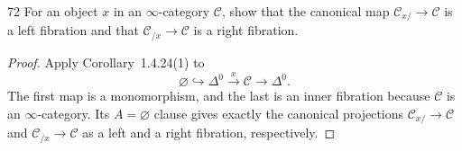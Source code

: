 \begin{exercise}{72}
For an object $x$ in an $\infty$-category $\mathcal C$, show that the canonical map $\mathcal C_{x/}\to\mathcal C$ is a
left fibration and that $\mathcal C_{/x}\to\mathcal C$ is a right fibration.

\begin{proof}
Apply Corollary~1.4.24(1) to
\[
 \varnothing\hookrightarrow\Delta^0
 \xrightarrow{x}\mathcal C\longrightarrow\Delta^0.
\]
The first map is a monomorphism, and the last is an
inner fibration because $\mathcal C$ is an
$\infty$-category.
Its $A=\varnothing$ clause gives exactly the canonical
projections $\mathcal C_{x/}\to\mathcal C$ and
$\mathcal C_{/x}\to\mathcal C$ as a left and a right
fibration, respectively.
\end{proof}
\end{exercise}
